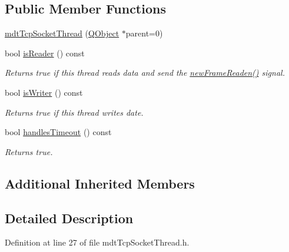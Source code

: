 \subsection*{Public Member Functions}
\begin{DoxyCompactItemize}
\item 
\hyperlink{classmdt_tcp_socket_thread_ab379d78b2d32a9361dbe46a009c687d4}{mdt\-Tcp\-Socket\-Thread} (\hyperlink{class_q_object}{Q\-Object} $\ast$parent=0)
\item 
bool \hyperlink{classmdt_tcp_socket_thread_a3224f12c8ff8d695975030f3f6215010}{is\-Reader} () const 
\begin{DoxyCompactList}\small\item\em Returns true if this thread reads data and send the \hyperlink{classmdt_port_thread_a7fc2245c753fd65e1beffec211c41461}{new\-Frame\-Readen()} signal. \end{DoxyCompactList}\item 
bool \hyperlink{classmdt_tcp_socket_thread_a014ad2b3a5fbe7031eeb1d42d8f0767d}{is\-Writer} () const 
\begin{DoxyCompactList}\small\item\em Returns true if this thread writes date. \end{DoxyCompactList}\item 
bool \hyperlink{classmdt_tcp_socket_thread_aa14c9838dfb8d2defac449b8b58bbc7c}{handles\-Timeout} () const 
\begin{DoxyCompactList}\small\item\em Returns true. \end{DoxyCompactList}\end{DoxyCompactItemize}
\subsection*{Additional Inherited Members}


\subsection{Detailed Description}


Definition at line 27 of file mdt\-Tcp\-Socket\-Thread.\-h.



